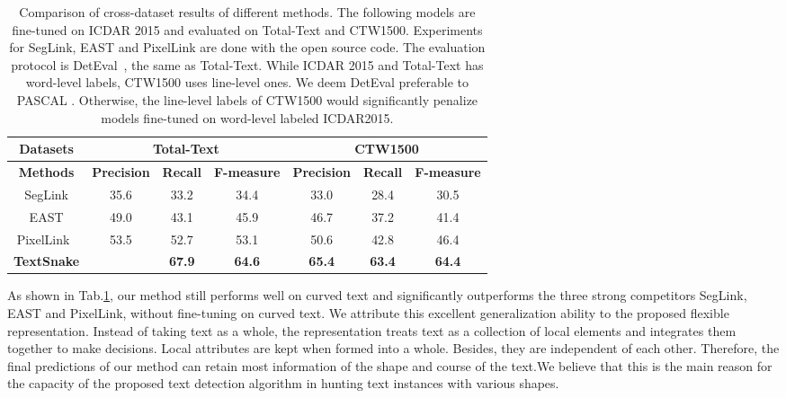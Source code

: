 \documentclass[runningheads]{llncs}
\begin{document}
\begin{table}
\small
\begin{centering}
\caption{Comparison of cross-dataset results of different methods. The following models are fine-tuned on ICDAR 2015 and evaluated on Total-Text and CTW1500. Experiments for SegLink, EAST and PixelLink are done with the open source code. The evaluation protocol is DetEval~\cite{wolf2006object}, the same as Total-Text. While ICDAR 2015 and Total-Text has word-level labels, CTW1500 uses line-level ones. We deem DetEval\cite{wolf2006object} preferable to PASCAL \cite{everingham2015pascal}. Otherwise, the line-level labels of CTW1500 would significantly penalize models fine-tuned on word-level labeled ICDAR2015.} 

\label{tab_cross}
\begin{tabular}{|c|c|c|c|c|c|c|}
\hline 
{\textbf{Datasets}} & \multicolumn{3}{|c|}{\textbf{Total-Text}} & \multicolumn{3}{|c|}{\textbf{CTW1500}} \tabularnewline
\hline
\textbf{Methods} & \textbf{Precision} & \textbf{Recall} & \textbf{F-measure} & \textbf{Precision} & \textbf{Recall} & \textbf{F-measure}\tabularnewline

\hline
SegLink\cite{Shi_2017_CVPR} & 35.6 & 33.2 & 34.4 & 33.0& 28.4& 30.5\tabularnewline
\hline
EAST\cite{Zhou_2017_CVPR} & 49.0 & 43.1 & 45.9 & 46.7& 37.2& 41.4\tabularnewline
\hline
PixelLink~\cite{deng2018pixellink} & 53.5 & 52.7 & 53.1 & 50.6& 42.8& 46.4\tabularnewline
\hline
\hline
\textbf{TextSnake} &  & \textbf{67.9} & \textbf{64.6} & \textbf{65.4}& \textbf{63.4}& \textbf{64.4} \tabularnewline
\hline
\end{tabular}
\par\end{centering}
\vspace{-2mm}
\end{table}

As shown in Tab.\ref{tab_cross}, our method still performs well on curved text and significantly outperforms the three strong competitors SegLink, EAST and PixelLink, without fine-tuning on curved text. We attribute this excellent generalization ability to the proposed flexible representation. Instead of taking text as a whole, the representation treats text as a collection of local elements and integrates them together to make decisions. Local attributes are kept when formed into a whole. Besides, they are independent of each other. Therefore, the final predictions of our method can retain most information of the shape and course of the text.We believe that this is the main reason for the capacity of the proposed text detection algorithm in hunting text instances with various shapes.
\end{document}
